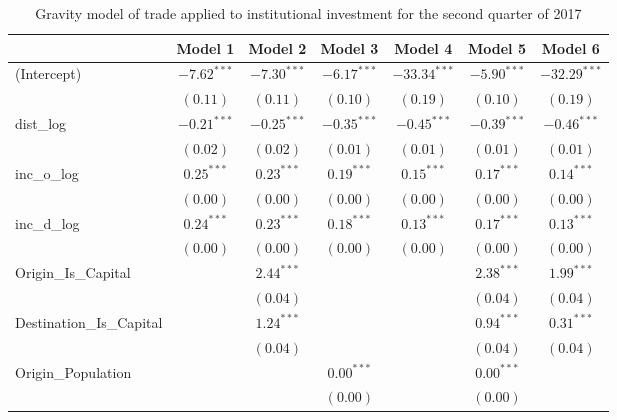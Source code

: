 \begin{table}
	\begin{center}
		\small
		\caption[Gravity Model of Trade for Q2 2017]{Gravity model of trade applied to institutional investment for the second quarter of 2017}
		\begin{tabular}{l c c c c c c }
			\hline
			& Model 1 & Model 2 & Model 3 & Model 4 & Model 5 & Model 6 \\
			\hline
			(Intercept)                  & $-7.62^{***}$ & $-7.30^{***}$ & $-6.17^{***}$ & $-33.34^{***}$ & $-5.90^{***}$ & $-32.29^{***}$ \\
			& $(0.11)$      & $(0.11)$      & $(0.10)$      & $(0.19)$       & $(0.10)$      & $(0.19)$       \\
			dist\_log                    & $-0.21^{***}$ & $-0.25^{***}$ & $-0.35^{***}$ & $-0.45^{***}$  & $-0.39^{***}$ & $-0.46^{***}$  \\
			& $(0.02)$      & $(0.02)$      & $(0.01)$      & $(0.01)$       & $(0.01)$      & $(0.01)$       \\
			inc\_o\_log                  & $0.25^{***}$  & $0.23^{***}$  & $0.19^{***}$  & $0.15^{***}$   & $0.17^{***}$  & $0.14^{***}$   \\
			& $(0.00)$      & $(0.00)$      & $(0.00)$      & $(0.00)$       & $(0.00)$      & $(0.00)$       \\
			inc\_d\_log                  & $0.24^{***}$  & $0.23^{***}$  & $0.18^{***}$  & $0.13^{***}$   & $0.17^{***}$  & $0.13^{***}$   \\
			& $(0.00)$      & $(0.00)$      & $(0.00)$      & $(0.00)$       & $(0.00)$      & $(0.00)$       \\
			Origin\_Is\_Capital          &               & $2.44^{***}$  &               &                & $2.38^{***}$  & $1.99^{***}$   \\
			&               & $(0.04)$      &               &                & $(0.04)$      & $(0.04)$       \\
			Destination\_Is\_Capital     &               & $1.24^{***}$  &               &                & $0.94^{***}$  & $0.31^{***}$   \\
			&               & $(0.04)$      &               &                & $(0.04)$      & $(0.04)$       \\
			Origin\_Population           &               &               & $0.00^{***}$  &                & $0.00^{***}$  &                \\
			&               &               & $(0.00)$      &                & $(0.00)$      &                \\

\end{tabular}
\end{center}
\end{table}
